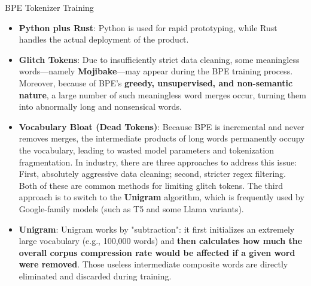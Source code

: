 \boxseparator

\begin{ideabox}{BPE Tokenizer Training}

    \begin{itemize}[label={}, leftmargin=0pt, itemsep=0.8em, parsep=0pt]
        \item \textbf{Python plus Rust}: Python is used for rapid prototyping, while Rust handles the actual deployment of the product.

        \item \textbf{Glitch Tokens}: Due to insufficiently strict data cleaning, some meaningless words—namely \textbf{Mojibake}—may appear during the BPE training process. Moreover, because of BPE's \textbf{greedy, unsupervised, and non-semantic nature}, a large number of such meaningless word merges occur, turning them into abnormally long and nonsensical words.

        \item \textbf{Vocabulary Bloat (Dead Tokens)}: Because BPE is incremental and never removes merges, the intermediate products of long words permanently occupy the vocabulary, leading to wasted model parameters and tokenization fragmentation. In industry, there are three approaches to address this issue: First, absolutely aggressive data cleaning; second, stricter regex filtering. Both of these are common methods for limiting glitch tokens. The third approach is to switch to the \textbf{Unigram} algorithm, which is frequently used by Google-family models (such as T5 and some Llama variants).

        \item \textbf{Unigram}: Unigram works by "subtraction": it first initializes an extremely large vocabulary (e.g., 100,000 words) and \textbf{then calculates how much the overall corpus compression rate would be affected if a given word were removed}. Those useless intermediate composite words are directly eliminated and discarded during training.
    \end{itemize}

\end{ideabox}

\boxseparator

